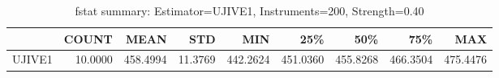 \begin{table}[ht]
\centering
\caption{fstat summary: Estimator=UJIVE1, Instruments=200, Strength=0.40}
\begin{tabular}{lrrrrrrrr}
\toprule
 & COUNT & MEAN & STD & MIN & 25\% & 50\% & 75\% & MAX \\
\midrule
UJIVE1 & 10.0000 & 458.4994 & 11.3769 & 442.2624 & 451.0360 & 455.8268 & 466.3504 & 475.4476 \\
\bottomrule
\end{tabular}
\end{table}
